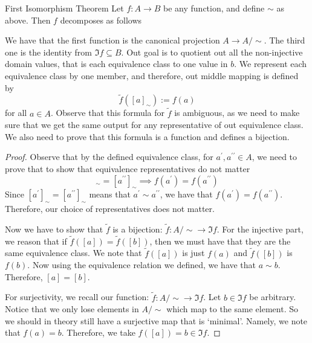 \documentclass{report}
\begin{document}
\begin{theorem}[\label{thm:1.2.7}]{First Isomorphism Theorem}
    Let $f : A \rightarrow B$ be any function, and define $\sim $ as above. Then $f$ decomposes as follows
    \begin{center}
    \end{center}
\end{theorem}

We have that the first function is the canonical projection $A \rightarrow A/\sim $. The third one is the identity from $\Im{f} \subseteq B$. Out goal is to quotient out all the non-injective domain values, that is each equivalence class to one value in $b$. We represent each equivalence class by one member, and therefore, out middle mapping is defined by
\begin{equation*}
    \tilde{f}([a]_{\sim }) := f(a)
\end{equation*}
for all $a \in A$. Observe that this formula for $\tilde{f}$ is ambiguous, as we need to make sure that we get the same output for any representative of out equivalence class. We also need to prove that this formula is a function and defines a bijection.
\begin{proof}
    Observe that by the defined equivalence class, for $a^{\prime}, a^{\prime\prime} \in A$, we need to prove that to show that equivalence representatives do not matter
    \begin{equation*}
        [a^{\prime}]_{\sim } = [a^{\prime\prime}]_{\sim } \implies f(a^{\prime}) = f(a^{\prime\prime})
    \end{equation*}
    Since $[a^{\prime}]_{\sim } = [a^{\prime\prime}]_{\sim }$ means that $a^{\prime} \sim a^{\prime\prime}$, we have that $f(a^{\prime}) = f(a^{\prime\prime})$. Therefore, our choice of representatives does not matter.

    Now we have to show that $\tilde{f}$ is a bijection: $\tilde{f} : A/ \sim \rightarrow \Im{f}$. For the injective part, we reason that if $\tilde{f}([a]) = \tilde{f}([b])$, then we must have that they are the same equivalence class. We note that $\tilde{f}([a])$ is just $f(a)$ and $\tilde{f}([b])$ is $f(b)$. Now using the equivalence relation we defined, we have that $a \sim b$. Therefore, $[a] = [b]$.

    For surjectivity, we recall our function: $\tilde{f} : A/\sim \rightarrow \Im{f}$. Let $b \in \Im{f}$ be arbitrary. Notice that we only lose elements in $A /\sim $ which map to the same element. So we should in theory still have a surjective map that is `minimal'. Namely, we note that $f(a) = b$. Therefore, we take $f([a]) = b \in \Im{f}$.
\end{proof}
\end{document}
